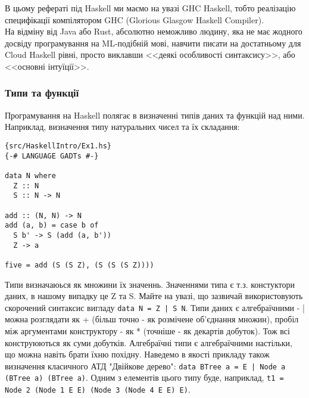 \documentclass[12pt]{article}
\begin{document}
В цьому рефераті під Haskell ми маємо на увазі GHC Haskell, тобто реалізацію специфікації компілятором GHC (Glorious Glasgow Haskell Compiler).\\

На відміну від Java або Rust, абсолютно неможливо людину, яка не має жодного досвіду програмування на ML-подібній мові, навчити писати на достатньому для Cloud Haskell рівні, просто виклавши <<деякі особливості синтаксису>>, або <<основні інтуїції>>.\\




\subsubsection*{Типи та функції}

Програмування на Haskell полягає в визначенні типів даних та функцій над ними. Наприклад, визначення типу натуральних чисел та їх складання:\\

\begin{lstlisting}{src/HaskellIntro/Ex1.hs}
{-# LANGUAGE GADTs #-}

data N where
  Z :: N
  S :: N -> N

add :: (N, N) -> N
add (a, b) = case b of
  S b' -> S (add (a, b'))
  Z -> a

five = add (S (S Z), (S (S (S Z))))
\end{lstlisting}

Типи визначаюься як множини їх значеннь. Значеннями типа є т.з. констуктори даних, в нашому випадку це Z та S. Майте на увазі, що зазвичай використовують скорочений синтаксис вигладу \lstinline{data N = Z | S N}. Типи даних є алгебраїчними - | можна розглядати як + (більш точно - як розмічене об'єднання множин), пробіл між аргументами конструктору - як * (точніше - як декартів добуток). Тож всі конструюються як суми добутків. Алгебраїчні типи є алгебраїчними настільки, що можна навіть брати їхню похідну. Наведемо в якості прикладу також визначення класичного АТД "Двійкове дерево": \lstinline{data BTree a = E | Node a (BTree a) (BTree a)}. Одним з елементів цього типу буде, наприклад, \lstinline{t1 = Node 2 (Node 1 E E) (Node 3 (Node 4 E E) E)}.
\end{document}
